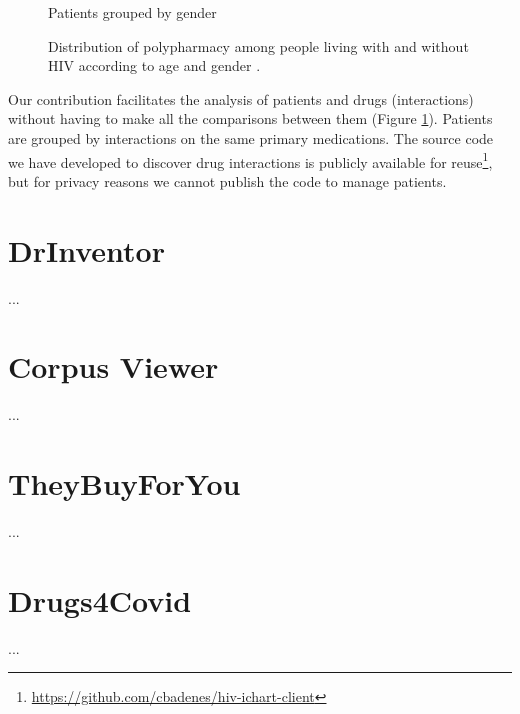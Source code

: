\begin{figure}[ht]
\begin {minipage}[c]{0.49\textwidth}
     \caption{Patients grouped by gender}\label{subfig:poly-gender}
   \end{minipage}
   \caption{Distribution of polypharmacy among people living with and without HIV according to age and gender \citep{Badenes-Olmedo2019c}.}
   \label{fig:polypharmacy}
\end{figure}

Our contribution facilitates the analysis of patients and drugs (interactions) without having to make all the comparisons between them (Figure \ref{fig:polypharmacy}). Patients are grouped by interactions on the same primary medications. The source code we have developed to discover drug interactions is publicly available for reuse\footnote{\url{https://github.com/cbadenes/hiv-ichart-client}}, but for privacy reasons we cannot publish the code to manage patients. 

\section{DrInventor}
\label{sec:drinventor}
...

\section{Corpus Viewer}
\label{sec:corpus-viewer}
...

\section{TheyBuyForYou}
\label{sec:tbfy}
...

\section{Drugs4Covid}
\label{sec:drugs4covid}
...